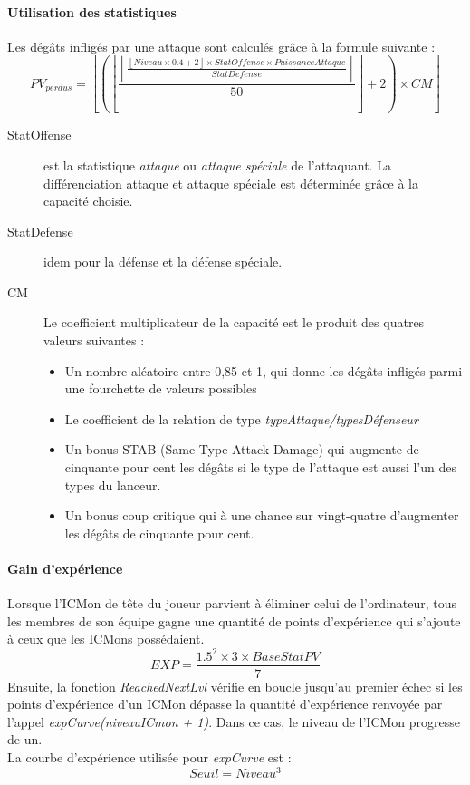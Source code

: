 \documentclass[12pt,a4paper, twoside]{article}
\begin{document}
        \paragraph{Utilisation des statistiques} Les dégâts infligés par une attaque sont calculés grâce à la formule suivante :
        \begin{equation}
            \displaystyle{  PV_{perdus} = \left \lfloor \left(\left\lfloor\frac{\left\lfloor\frac{\left\lfloor Niveau \times 0.4 +2 \right\rfloor \times StatOffense \times PuissanceAttaque}{StatDefense}\right\rfloor}{50} \right\rfloor +2 \right) \times CM \right \rfloor  }
        \end{equation}
        \begin{description}
        \item[StatOffense]{est la statistique \emph{attaque} ou \emph{attaque spéciale} de l'attaquant. La différenciation attaque et attaque spéciale est déterminée grâce à la capacité choisie.}
        \item[StatDefense]{idem pour la défense et la défense spéciale.}
        \item[CM]{Le coefficient multiplicateur de la capacité est le produit des quatres valeurs suivantes :\\
            \begin{itemize}
                \item Un nombre aléatoire entre 0,85 et 1, qui donne les dégâts infligés parmi une fourchette de valeurs possibles
                \item Le coefficient de la relation de type \emph{typeAttaque/typesDéfenseur}
                \item Un bonus STAB (Same Type Attack Damage) qui augmente de cinquante pour cent les dégâts si le type de l'attaque est aussi l'un des types du lanceur.
                \item Un bonus coup critique qui à une chance sur vingt-quatre d'augmenter les dégâts de cinquante pour cent.
            \end{itemize}
        }
        \end{description}
        \paragraph{Gain d'expérience} Lorsque l'ICMon de tête du joueur parvient à éliminer celui de l'ordinateur, tous les membres de son équipe gagne une quantité de points d'expérience qui s'ajoute à ceux que les ICMons possédaient.
        \begin{equation}
            \displaystyle{ EXP = \dfrac {1.5 ^ 2 \times 3 \times BaseStatPV}{7} }
        \end{equation}
        Ensuite, la fonction \emph{ReachedNextLvl} vérifie en boucle jusqu'au premier échec si les points d'expérience d'un ICMon dépasse la quantité d'expérience renvoyée par l'appel \emph{expCurve(niveauICmon + 1)}. Dans ce cas, le niveau de l'ICMon progresse de un.\\
        La courbe d'expérience utilisée pour \emph{expCurve} est :
        \begin{equation}
            \displaystyle{ Seuil = Niveau ^ 3}
        \end{equation}
\newpage
\end{document}
